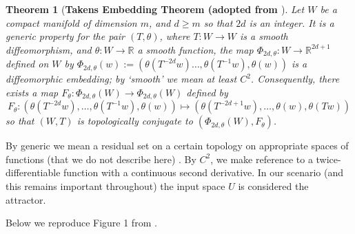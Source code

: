 \documentclass[a4paper,12pt,twoside]{report}
\newtheorem{Theorem}{Theorem}[]
\newcommand{\Ftheta}{\ensuremath{F_\theta}}
\begin{document}
\begin{Theorem} 
	[\bf Takens Embedding Theorem (adopted from \cite{takens1981detecting}] \label{Thm_Takens}
         Let $W$ be a compact manifold of dimension $m$, and $d\ge m$ so that $2d$ is an integer. It is a 
            generic property for the pair $(T, \theta)$,  where $T:W \to W$ is
            a smooth diffeomorphism, and $\theta:W \to \mathbb{R}$ a smooth function, the map $\Phi_{2d,\theta}:W \to \mathbb{R}^{2d+1}$ defined on $W$ by 
            $\Phi_{2d,\theta}(w) := (\theta(T^{-2d}w)\ldots,\theta(T^{-1}w),\theta(w))$
            is a diffeomorphic embedding; by `smooth' we mean at least $C^2$. Consequently, there exists a map $F_\theta: \Phi_{2d,\theta}(W) \to \Phi_{2d,\theta}(W)$ defined by $$F_\theta: (\theta(T^{-2d}w),\ldots,\theta(T^{-1}w),\theta(w)) \mapsto 
            (\theta(T^{-2d+1}w),\ldots,\theta(w),\theta(Tw))$$
           so that $(W,T)$ is topologically conjugate to 
            $(\Phi_{2d,\theta}(W), F_\theta)$.    
\end{Theorem} 

By generic we mean a residual set on a certain topology on appropriate spaces of functions (that we do not describe here) . 
By $C^2$, we make reference to a twice-differentiable function  with a continuous second derivative. In our scenario (and this remains important throughout) the input space $U$ is considered the attractor.~\label{attractor_U}

Below we reproduce Figure 1 from \cite{Supp}.


\end{document}
